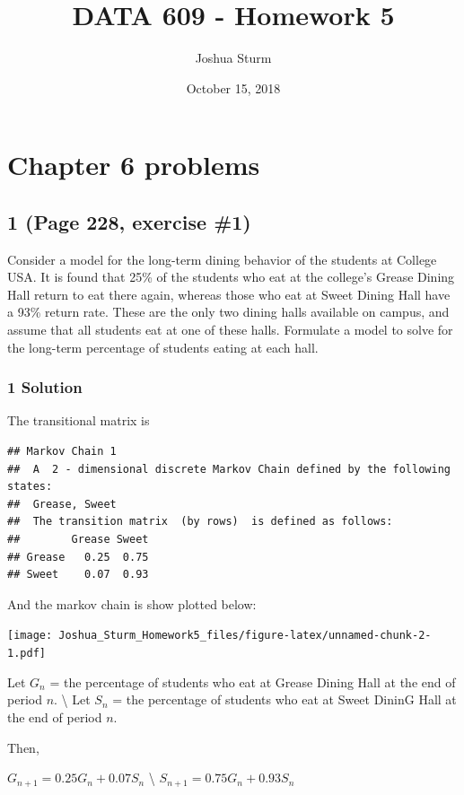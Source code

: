 \documentclass[]{article}
\title{DATA 609 - Homework 5}
\author{Joshua Sturm}
\date{October 15, 2018}
\begin{document}
\maketitle

\hypertarget{chapter-6-problems}{%
\section{Chapter 6 problems}\label{chapter-6-problems}}

\hypertarget{page-228-exercise-1}{%
\subsection{1 (Page 228, exercise \#1)}\label{page-228-exercise-1}}

Consider a model for the long-term dining behavior of the students at
College USA. It is found that 25\% of the students who eat at the
college's Grease Dining Hall return to eat there again, whereas those
who eat at Sweet Dining Hall have a 93\% return rate. These are the only
two dining halls available on campus, and assume that all students eat
at one of these halls. Formulate a model to solve for the long-term
percentage of students eating at each hall.

\hypertarget{solution}{%
\subsubsection{1 Solution}\label{solution}}

The transitional matrix is

\begin{verbatim}
## Markov Chain 1 
##  A  2 - dimensional discrete Markov Chain defined by the following states: 
##  Grease, Sweet 
##  The transition matrix  (by rows)  is defined as follows: 
##        Grease Sweet
## Grease   0.25  0.75
## Sweet    0.07  0.93
\end{verbatim}

And the markov chain is show plotted below:

\texttt{[image: Joshua\_Sturm\_Homework5\_files/figure-latex/unnamed-chunk-2-1.pdf]}

Let \(G_n\) = the percentage of students who eat at Grease Dining Hall
at the end of period \(n\). \textbackslash{} Let \(S_n\) = the
percentage of students who eat at Sweet DininG Hall at the end of period
\(n\).

Then,

\(G_{n+1} = 0.25G_n + 0.07S_n\) \textbackslash{}
\(S_{n+1} = 0.75G_n + 0.93S_n\)
\end{document}
